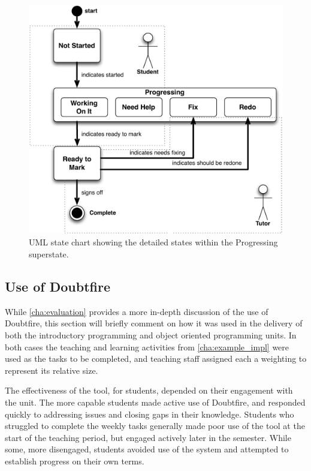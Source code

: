 \begin{figure}[thbp]
  \centering
  \includegraphics[width=\textwidth]{DetailedStepsInProgress}
  \caption{UML state chart showing the detailed states within the Progressing superstate.}
  \label{fig:detailed_states}
\end{figure}


\subsection{Use of Doubtfire} %
\label{sub:use_of_doubtfire}

While \cref{cha:evaluation} provides a more in-depth discussion of the use of Doubtfire, this section will briefly comment on how it was used in the delivery of both the introductory programming and object oriented programming units. In both cases the teaching and learning activities from \cref{cha:example_impl} were used as the tasks to be completed, and teaching staff assigned each a weighting to represent its relative size.

The effectiveness of the tool, for students, depended on their engagement with the unit. The more capable students made active use of Doubtfire, and responded quickly to addressing issues and closing gaps in their knowledge. Students who struggled to complete the weekly tasks generally made poor use of the tool at the start of the teaching period, but engaged actively later in the semester. While some, more disengaged, students avoided use of the system and attempted to establish progress on their own terms. 

